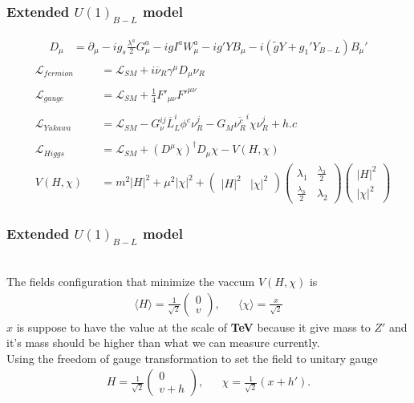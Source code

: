 \documentclass{beamer}
\begin{document}
\begin{frame}
\frametitle{Extended $U(1)_{B-L}$ model}
\begin{align*}
D_\mu&=\partial_\mu - ig_s \frac{\lambda^a}{2}G_\mu^a-i g I^a W_\mu^a-i g' YB_\mu -i(\tilde{g} Y+ g_1' Y_{B-L})B_\mu'\\
\end{align*}
\begin{align*}
&\mathcal{L}_{fermion}&&=\mathcal{L}_{SM}+ i\overline{\nu}_R \gamma^\mu D_\mu \nu_R\\\\
&\mathcal{L}_{gauge}&&=\mathcal{L}_{SM}+ \frac{1}{4}F'_{\mu\nu}F'^{\mu\nu}\\\\
&\mathcal{L}_{Yukawa}&&=\mathcal{L}_{SM}-G^{ij}_\nu\overline{L}^{i}_L \phi^c \nu_R^{j}-
G_M\overline{\nu_R^c}^{i} \chi\nu_R^{j}+h.c\\\\
&\mathcal{L}_{Higgs}&&=\mathcal{L}_{SM}+(D^\mu\chi)^\dagger  D_\mu \chi- V(H,\chi)\\
&V(H,\chi)&&=	m^2|H|^2+\mu^2|\chi|^2+\begin{pmatrix}
|H|^2 & |\chi|^2
\end{pmatrix}
\begin{pmatrix}
\lambda_1 & \frac{\lambda_3}{2}\\
\frac{\lambda_3}{2}& \lambda_2
\end{pmatrix}
\begin{pmatrix}
|H|^2\\
|\chi|^2
\end{pmatrix}
\end{align*}
\end{frame}
\begin{frame}
\frametitle{Extended $U(1)_{B-L}$ model}
\\
The fields configuration that minimize the vaccum $V(H,\chi)$ is
\begin{align*}
\langle H\rangle=\frac{1}{\sqrt{2}}\begin{pmatrix}
0\\v
\end{pmatrix},&& \langle \chi\rangle =\frac{x}{\sqrt{2}}
\end{align*}
$x$ is suppose to have the value at the scale of  \textbf{TeV}
because it give mass to $Z'$ and it's mass should be higher than what we can measure currently.\\
Using the freedom of gauge transformation to set the field to unitary gauge
\begin{align*}
H=\frac{1}{\sqrt{2}}\begin{pmatrix}
0\\
v +h
\end{pmatrix},&&\chi=\frac{1}{\sqrt{2}}(x+h') .
\end{align*}
\end{frame}
\end{document}
